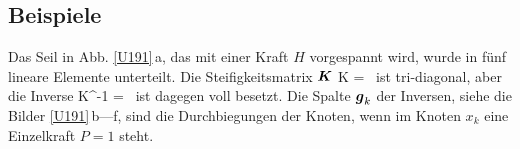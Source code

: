 {\textcolor{sectionTitleBlue}{\section{Beispiele}}}
Das Seil in Abb. \ref{U191}\,a, das mit einer Kraft $H$ vorgespannt wird, wurde in f\"{u}nf lineare Elemente unterteilt. Die Steifigkeitsmatrix
$\mbox{\boldmath $K$}$
\beq
    \vek K = 
    \,
\eeq
ist tri-diagonal, aber die Inverse
\beq
   \vek K^{-1} = 
    \,
\eeq
ist dagegen voll besetzt. Die Spalte $\mbox{\boldmath $g$}_k$ der Inversen, siehe die Bilder \ref{U191}\,b---f, sind die Durchbiegungen der Knoten, wenn im Knoten $x_k$ eine Einzelkraft $P = 1$ steht.

